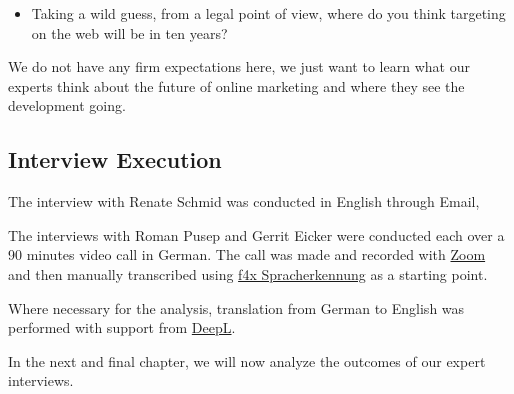 \begin{itemize} 
 \item Taking a wild guess, from a legal point of view, where do you think targeting on the web will be in ten years?
\end{itemize}

We do not have any firm expectations here, we just want to learn what our experts think about the future of online marketing and where they see the development going.

\subsection{Interview Execution}

The interview with Renate Schmid was conducted in English through Email,

The interviews with Roman Pusep and Gerrit Eicker were conducted each over a 90 minutes video call in German. The call was made and recorded with \href{https://zoom.us/}{Zoom} and then manually transcribed using \href{https://f4x.audiotranskription.de/}{f4x Spracherkennung} as a starting point. 

Where necessary for the analysis, translation from German to English was performed with support from \href{https://www.deepl.com/en/translator}{DeepL}.

In the next and final chapter, we will now analyze the outcomes of our expert interviews.
